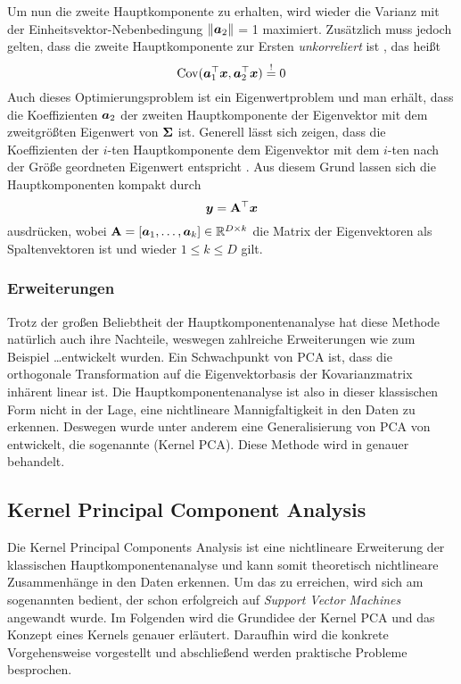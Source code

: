 Um nun die zweite Hauptkomponente zu erhalten, wird wieder die Varianz mit der
Einheitsvektor-Nebenbedingung $\lVert\bm{a}_2\rVert$ = 1 maximiert. Zusätzlich muss jedoch gelten,
dass die zweite Hauptkomponente zur Ersten \textit{unkorreliert} ist \parencite[5]{Jolliffe.2002}, das heißt
\begin{equation}
	\operatorname{Cov}(\bm{a}_1^\top\bm{x}, \bm{a}_2^\top\bm{x}) \overset{!}{=} 0
\end{equation}
Auch dieses Optimierungsproblem ist ein Eigenwertproblem und man erhält, dass die Koeffizienten $\bm{a}_2$ der zweiten Hauptkomponente der Eigenvektor mit dem zweitgrößten Eigenwert von $\mathbf{\Sigma}$ ist.
Generell lässt sich zeigen, dass die Koeffizienten der $i$-ten Hauptkomponente dem Eigenvektor mit dem $i$-ten nach der Größe geordneten Eigenwert entspricht \parencite[6]{Jolliffe.2002}. Aus diesem Grund lassen sich die Hauptkomponenten kompakt durch
\begin{equation}
	\bm{y} = \mathbf{A}^\top \bm{x}
\end{equation}
ausdrücken, wobei $\mathbf{A} = [\bm{a}_1,\ldots,\bm{a}_k] \in \mathbb{R}^{D \times k}$ die Matrix der Eigenvektoren als Spaltenvektoren ist und wieder $1 \leq k \leq D$ gilt.

\subsubsection{Erweiterungen}
\label{ch:MethodenDerDimRed:statistisch:PCA:Erweiterungen}
Trotz der großen Beliebtheit der Hauptkomponentenanalyse hat diese Methode natürlich auch ihre Nachteile, weswegen zahlreiche Erweiterungen wie zum Beispiel \ldots\addref entwickelt wurden.
Ein Schwachpunkt von PCA ist, dass die orthogonale Transformation auf die Eigenvektorbasis der Kovarianzmatrix inhärent linear ist. Die Hauptkomponentenanalyse ist also in dieser klassischen Form nicht in der Lage, eine nichtlineare Mannigfaltigkeit in den Daten zu erkennen. Deswegen wurde unter anderem eine Generalisierung von PCA von \textcite{Scholkopf.1997} entwickelt, die sogenannte  (Kernel PCA). Diese Methode wird in  genauer behandelt.

\subsection{Kernel Principal Component Analysis}
\label{ch:MethodenDerDimRed:statistisch:kPCA}
Die Kernel Principal Components Analysis \parencite{Scholkopf.1997} ist eine nichtlineare Erweiterung der klassischen Hauptkomponentenanalyse
und kann somit theoretisch nichtlineare Zusammenhänge in den Daten erkennen. Um das zu erreichen,
wird sich am sogenannten  bedient, der schon erfolgreich auf \textit{Support
	Vector Machines} \parencite{Boser.1992} angewandt wurde. Im Folgenden wird die Grundidee der Kernel PCA und das Konzept
eines Kernels genauer erläutert. Daraufhin wird die konkrete Vorgehensweise vorgestellt und
abschließend werden praktische Probleme besprochen.

